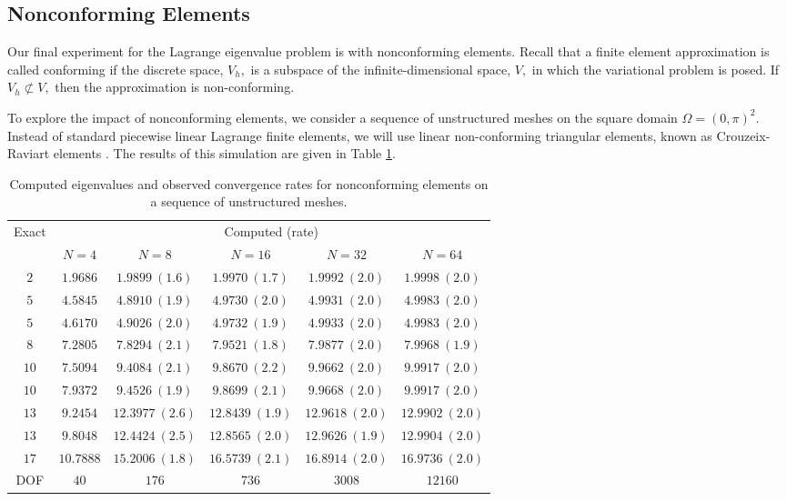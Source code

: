 \documentclass[12pt,a4paper]{article}
\theoremstyle{boldthm}
\theoremstyle{bolddefn}
\begin{document}
\subsection{Nonconforming Elements}


Our final experiment for the Lagrange eigenvalue problem is with nonconforming elements.
Recall that a finite element approximation is called conforming if the discrete space, $V_h,$ is a subspace of the infinite-dimensional space, $V,$ in which the variational problem is posed. If $V_h \not\subset V,$ then the approximation is non-conforming.

To explore the impact of nonconforming elements, we consider a sequence of unstructured meshes on the square domain $\Omega = (0, \pi)^2.$ Instead of standard piecewise linear Lagrange finite elements, we will use linear non-conforming triangular elements, known as Crouzeix-Raviart elements \cite{boffi}. The results of this simulation are given in Table \ref{noncon}.

\begin{table}[ht]
\centering
\begin{tabular}{c|ccccc}
\toprule
\multicolumn{1}{c}{Exact}
&
\multicolumn{5}{c}{Computed (rate)}
\\
\cmidrule(lr){2-6}
&
$N=4$
&
$N=8$
&
$N=16$
&
$N=32$
&
$N=64$
\\
\midrule
$2$
&
$1.9686$
&
$1.9899\ (1.6)$
&
$1.9970\ (1.7)$
&
$1.9992\ (2.0)$
&
$1.9998\ (2.0)$
\\
$5$
&
$4.5845$
&
$4.8910\ (1.9)$
&
$4.9730\ (2.0)$
&
$4.9931\ (2.0)$
&
$4.9983\ (2.0)$
\\
$5$
&
$4.6170$
&
$4.9026\ (2.0)$
&
$4.9732\ (1.9)$
&
$4.9933\ (2.0)$
&
$4.9983\ (2.0)$
\\
$8$
&
$7.2805$
&
$7.8294\ (2.1)$
&
$7.9521\ (1.8)$
&
$7.9877\ (2.0)$
&
$7.9968\ (1.9)$
\\
$10$
&
$7.5094$
&
$9.4084\ (2.1)$
&
$9.8670\ (2.2)$
&
$9.9662\ (2.0)$
&
$9.9917\ (2.0)$
\\
$10$
&
$7.9372$
&
$9.4526\ (1.9)$
&
$9.8699\ (2.1)$
&
$9.9668\ (2.0)$
&
$9.9917\ (2.0)$
\\
$13$
&
$9.2454$
&
$12.3977\ (2.6)$
&
$12.8439\ (1.9)$
&
$12.9618\ (2.0)$
&
$12.9902\ (2.0)$
\\
$13$
&
$9.8048$
&
$12.4424\ (2.5)$
&
$12.8565\ (2.0)$
&
$12.9626\ (1.9)$
&
$12.9904\ (2.0)$
\\
$17$
&
$10.7888$
&
$15.2006\ (1.8)$
&
$16.5739\ (2.1)$
&
$16.8914\ (2.0)$
&
$16.9736\ (2.0)$
\\
\midrule
DOF
&
$40$
&
$176$
&
$736$
&
$3008$
&
$12160$
\\
\bottomrule
\end{tabular}
\caption{Computed eigenvalues and observed convergence rates for nonconforming elements on a sequence of unstructured meshes.}
\label{noncon}
\end{table}
\end{document}
